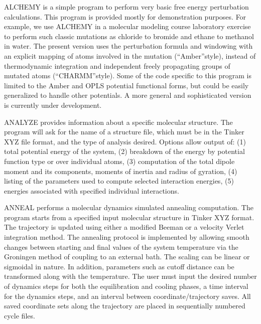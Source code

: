 \documentclass[letterpaper,11pt,english]{sphinxmanual}
\begin{document}

ALCHEMY is a simple program to perform very basic free energy perturbation calculations. This program is provided mostly for demonstration purposes.  For example, we use ALCHEMY in a molecular modeling course laboratory exercise to perform such classic mutations as chloride to bromide and ethane to methanol in water. The present version uses the perturbation formula and windowing with an explicit mapping of atoms involved in the mutation (“Amber”\sphinxhyphen{}style), instead of thermodynamic integration and independent freely propagating groups of mutated atoms (“CHARMM”\sphinxhyphen{}style). Some of the code specific to this program is limited to the Amber and OPLS potential functional forms, but could be easily generalized to handle other potentials. A more general and sophisticated version is currently under development.


ANALYZE provides information about a specific molecular structure. The program will ask for the name of a structure file, which must be in the Tinker XYZ file format, and the type of analysis desired. Options allow output of:  (1) total potential energy of the system, (2) breakdown of the energy by potential function type or over individual atoms, (3) computation of the total dipole moment and its components, moments of inertia and radius of gyration, (4) listing of the parameters used to compute selected interaction energies, (5) energies associated with specified individual interactions.


ANNEAL performs a molecular dynamics simulated annealing computation. The program starts from a specified input molecular structure in Tinker XYZ format. The trajectory is updated using either a modified Beeman or a velocity Verlet integration method. The annealing protocol is implemented by allowing smooth changes between starting and final values of the system temperature via the Groningen method of coupling to an external bath. The scaling can be linear or sigmoidal in nature. In addition, parameters such as cutoff distance can be transformed along with the temperature. The user must input the desired number of dynamics steps for both the equilibration and cooling phases, a time interval for the dynamics steps, and an interval between coordinate/trajectory saves. All saved coordinate sets along the trajectory are placed in sequentially numbered cycle files.
\end{document}

